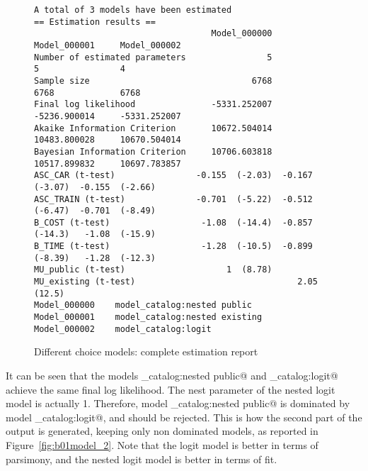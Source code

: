 \documentclass[12pt,a4paper]{article}
\begin{document}
\begin{landscape}
  \begin{figure}[p]
\begin{lstlisting}
A total of 3 models have been estimated
== Estimation results ==
                                   Model_000000     Model_000001     Model_000002
Number of estimated parameters                5                5                4
Sample size                                6768             6768             6768
Final log likelihood               -5331.252007     -5236.900014     -5331.252007
Akaike Information Criterion       10672.504014     10483.800028     10670.504014
Bayesian Information Criterion     10706.603818     10517.899832     10697.783857
ASC_CAR (t-test)                -0.155  (-2.03)  -0.167  (-3.07)  -0.155  (-2.66)
ASC_TRAIN (t-test)              -0.701  (-5.22)  -0.512  (-6.47)  -0.701  (-8.49)
B_COST (t-test)                  -1.08  (-14.4)  -0.857  (-14.3)   -1.08  (-15.9)
B_TIME (t-test)                  -1.28  (-10.5)  -0.899  (-8.39)   -1.28  (-12.3)
MU_public (t-test)                    1  (8.78)
MU_existing (t-test)                                2.05  (12.5)
Model_000000	model_catalog:nested public
Model_000001	model_catalog:nested existing
Model_000002	model_catalog:logit
\end{lstlisting}
\caption{\label{fig:b01model}Different choice models: complete estimation report}
  \end{figure}
  
\end{landscape}

It can be seen that the models \lstinline@model_catalog:nested public@
and \lstinline@model_catalog:logit@ achieve the same final log
likelihood. The nest parameter of the nested logit model is actually
1. Therefore, model \lstinline@model_catalog:nested public@
is dominated by model \lstinline@model_catalog:logit@, and should be rejected. This is how the second part of the output is generated, keeping only non dominated models, as reported in Figure~\vref{fig:b01model_2}. Note that the logit model is better in terms of parsimony, and the nested logit model is better in terms of fit. 
\end{document}

